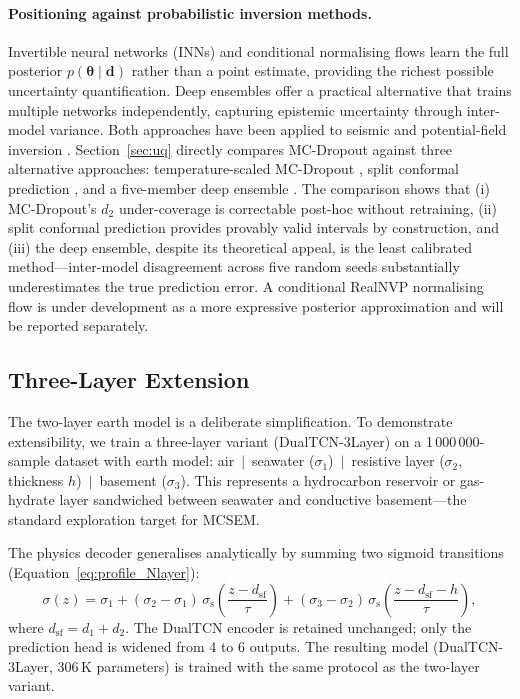 \documentclass[journal]{IEEEtran}
\begin{document}
\paragraph{Positioning against probabilistic inversion methods.}
Invertible neural networks (INNs) and conditional normalising flows
\citep{ardizzone2019inn, papamakarios2021normalizing} learn the full
posterior $p(\boldsymbol{\theta} \mid \mathbf{d})$ rather than a
point estimate, providing the richest possible uncertainty
quantification.  Deep ensembles \citep{lakshminarayanan2017} offer a
practical alternative that trains multiple networks independently,
capturing epistemic uncertainty through inter-model variance.  Both
approaches have been applied to seismic and potential-field inversion
\citep{mosser2020stochastic, bloem2023posterior}.  Section~\ref{sec:uq}
directly compares MC-Dropout against three alternative approaches:
temperature-scaled MC-Dropout \citep{guo2017calibration}, split
conformal prediction \citep{angelopoulos2023conformal}, and a
five-member deep ensemble \citep{lakshminarayanan2017}.
The comparison shows that (i) MC-Dropout's
$d_2$ under-coverage is correctable post-hoc without retraining, (ii)
split conformal prediction provides provably valid intervals by
construction, and (iii) the deep ensemble, despite its theoretical
appeal, is the least calibrated method---inter-model disagreement
across five random seeds substantially underestimates the true
prediction error.  A conditional RealNVP normalising flow
\citep{dinh2017realnvp, papamakarios2021normalizing} is under
development as a more expressive posterior approximation and will
be reported separately.

\subsection{Three-Layer Extension}
\label{sec:multilayer}

The two-layer earth model is a deliberate simplification.  To
demonstrate extensibility, we train a three-layer variant
(DualTCN-3Layer) on a 1\,000\,000-sample dataset with earth model:
air~$|$~seawater ($\sigma_1$)~$|$~resistive layer ($\sigma_2$,
thickness $h$)~$|$~basement ($\sigma_3$).  This represents a
hydrocarbon reservoir or gas-hydrate layer sandwiched between seawater
and conductive basement---the standard exploration target for MCSEM.

The physics decoder generalises analytically by summing two sigmoid
transitions (Equation~\ref{eq:profile_Nlayer}):
\begin{equation}
  \sigma(z) = \sigma_1
    + (\sigma_2 - \sigma_1)\,\sigma_\mathrm{s}\!\left(
        \frac{z - d_\mathrm{sf}}{\tau}\right)
    + (\sigma_3 - \sigma_2)\,\sigma_\mathrm{s}\!\left(
        \frac{z - d_\mathrm{sf} - h}{\tau}\right),
  \label{eq:profile_Nlayer}
\end{equation}
where $d_\mathrm{sf} = d_1 + d_2$.  The DualTCN encoder is retained
unchanged; only the prediction head is widened from 4 to 6 outputs.
The resulting model (DualTCN-3Layer, 306\,K parameters) is trained
with the same protocol as the two-layer variant.
\end{document}
